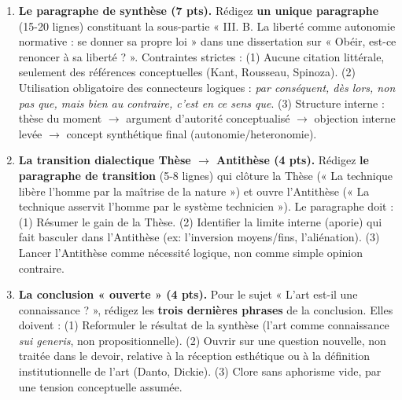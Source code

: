 \documentclass[11pt]{article}
\begin{document}
\begin{exercice}
\begin{enumerate}
    \item \textbf{Le paragraphe de synthèse (7 pts).} Rédigez \textbf{un unique paragraphe} (15-20 lignes) constituant la sous-partie « III. B. La liberté comme autonomie normative : se donner sa propre loi » dans une dissertation sur « Obéir, est-ce renoncer à sa liberté ? ». Contraintes strictes : (1) Aucune citation littérale, seulement des références conceptuelles (Kant, Rousseau, Spinoza). (2) Utilisation obligatoire des connecteurs logiques : \textit{par conséquent, dès lors, non pas que, mais bien au contraire, c'est en ce sens que}. (3) Structure interne : thèse du moment $\rightarrow$ argument d'autorité conceptualisé $\rightarrow$ objection interne levée $\rightarrow$ concept synthétique final (autonomie/heteronomie).
    \item \textbf{La transition dialectique Thèse $\rightarrow$ Antithèse (4 pts).} Rédigez \textbf{le paragraphe de transition} (5-8 lignes) qui clôture la Thèse (« La technique libère l'homme par la maîtrise de la nature ») et ouvre l'Antithèse (« La technique asservit l'homme par le système technicien »). Le paragraphe doit : (1) Résumer le gain de la Thèse. (2) Identifier la limite interne (aporie) qui fait basculer dans l'Antithèse (ex: l'inversion moyens/fins, l'aliénation). (3) Lancer l'Antithèse comme nécessité logique, non comme simple opinion contraire.
    \item \textbf{La conclusion « ouverte » (4 pts).} Pour le sujet « L'art est-il une connaissance ? », rédigez les \textbf{trois dernières phrases} de la conclusion. Elles doivent : (1) Reformuler le résultat de la synthèse (l'art comme connaissance \textit{sui generis}, non propositionnelle). (2) Ouvrir sur une question nouvelle, non traitée dans le devoir, relative à la réception esthétique ou à la définition institutionnelle de l'art (Danto, Dickie). (3) Clore sans aphorisme vide, par une tension conceptuelle assumée.
\end{enumerate}
\end{exercice}
\end{document}
